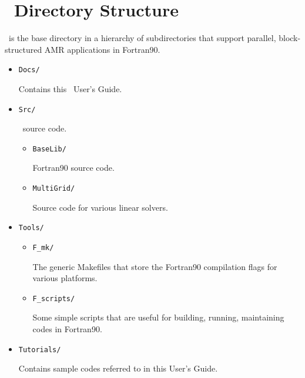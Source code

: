 \section{\FBoxLib\ Directory Structure}

\FBoxLib\ is the base directory in a hierarchy of subdirectories that
support parallel, block-structured AMR applications in Fortran90.

\begin{itemize}

\item {\tt Docs/}

Contains this \FBoxLib\ User's Guide.

\item {\tt Src/}

  \FBoxLib\ source code.

  \begin{itemize}

    \item {\tt BaseLib/}

    Fortran90 source code.

    \item {\tt MultiGrid/}

    Source code for various linear solvers.

  \end{itemize}

\item {\tt Tools/}

  \begin{itemize}

  \item {\tt F\_mk/}

  The generic Makefiles that store the Fortran90 compilation flags for
  various platforms.

  \item {\tt F\_scripts/}

  Some simple scripts that are useful for building, running,
  maintaining codes in Fortran90.

  \end{itemize}

\item {\tt Tutorials/}

  Contains sample codes referred to in this User's Guide.

\end{itemize}
